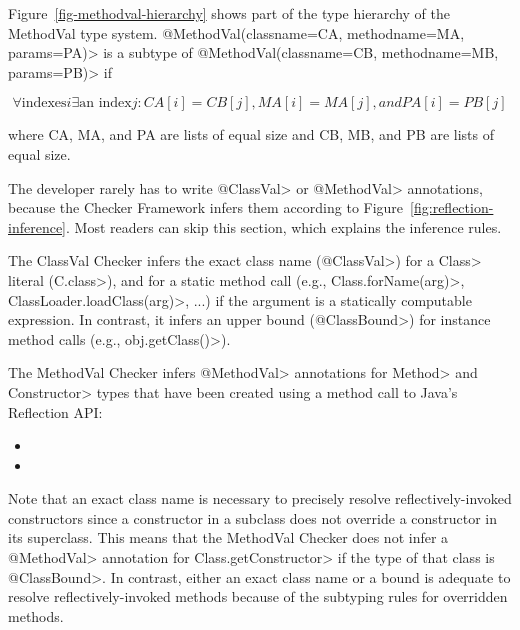 Figure~\ref{fig-methodval-hierarchy} shows part of the type hierarchy of  the
MethodVal type system.  \<@MethodVal(classname=CA, methodname=MA, params=PA)> is a subtype of
\<@MethodVal(classname=CB, methodname=MB, params=PB)> if

\[\forall \textrm{indexes} i \exists \textrm{an index} j:  CA[i] = CB[j], MA[i] = MA[j], and PA[i] = PB[j]\]

\noindent
where CA, MA, and PA are lists of equal size and CB, MB, and PB are lists of equal size.




The developer rarely has to write \<@ClassVal> or \<@MethodVal>
annotations, because the Checker Framework infers them according to
Figure~\ref{fig:reflection-inference}.  Most readers can skip this
section, which explains the inference rules.



The ClassVal Checker infers the exact class name (\<@ClassVal>) for a
\<Class> literal (\<C.class>), and for a static method call (e.g.,
\<Class.forName(arg)>, \<ClassLoader.loadClass(arg)>, ...) if the argument is a
statically computable expression.  In contrast, it infers an upper bound
(\<@ClassBound>) for instance method calls (e.g., \<obj.getClass()>).

The MethodVal Checker infers \<@MethodVal> annotations for \<Method> and
\<Constructor> types that have been created using a method call to Java's Reflection
API\@:
\begin{itemize}
    \item {}
    \item {}
\end{itemize}

Note that an exact class name is necessary to precisely resolve
reflectively-invoked constructors since a constructor in a subclass does not
override a constructor in its superclass. This means that the MethodVal Checker
does not infer a \<@MethodVal> annotation for \<Class.getConstructor> if the
type of that class is \<@ClassBound>. In contrast, either an exact class name or a bound
is adequate to resolve reflectively-invoked methods because of the subtyping
rules for overridden methods.


